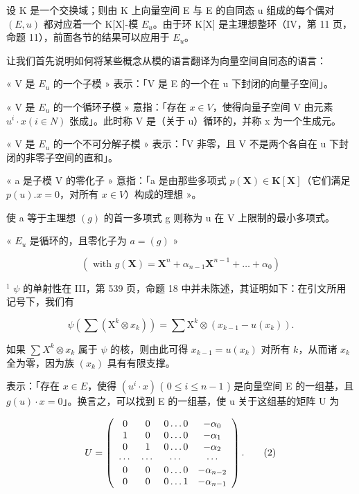 设 K 是一个交换域；则由 K 上向量空间 E 与 E 的自同态 u 组成的每个偶对 \((E, u)\) 都对应着一个 K{[}X{]}-模 \(E_{u}\)。由于环 K{[}X{]} 是主理想整环（IV，第 11 页，命题 11），前面各节的结果可以应用于 \(E_{u}\)。

让我们首先说明如何将某些概念从模的语言翻译为向量空间自同态的语言：

« V 是 \(E_{u}\) 的一个子模 » 表示：「V 是 E 的一个在 u 下封闭的向量子空间」。

« V 是 \(E_{u}\) 的一个循环子模 » 意指：「存在 \(x \in V\)，使得向量子空间 V 由元素 \(u^{i} \cdot x (i \in N)\) 张成」。此时称 V 是（关于 u）循环的，并称 x 为一个生成元。

« V 是 \(E_{u}\) 的一个不可分解子模 » 表示：「V 非零，且 V 不是两个各自在 u 下封闭的非零子空间的直和」。

« a 是子模 V 的零化子 » 意指：「a 是由那些多项式 \(p(\mathbf{X}) \in \mathbf{K}[\mathbf{X}]\)（它们满足 \(p(u).x = 0\)，对所有 \(x \in V\)）构成的理想 »。

使 a 等于主理想 \((g)\) 的首一多项式 g 则称为 u 在 V 上限制的最小多项式。

« \(E_{u}\) 是循环的，且零化子为 \(a = (g)\) »

\[
\left(\text { with } g (\mathbf {X}) = \mathbf {X} ^ {n} + \alpha_ {n - 1} \mathbf {X} ^ {n - 1} + \dots + \alpha_ {0}\right)
\]

\(^{1}\) \(\psi\) 的单射性在 III，第 539 页，命题 18 中并未陈述，其证明如下：在引文所用记号下，我们有

\[
\psi \left(\sum \left(\mathrm{X} ^ {k} \otimes x _ {k}\right)\right) = \sum \mathrm{X} ^ {k} \otimes \left(x _ {k - 1} - u (x _ {k})\right).
\]

如果 \(\sum X^k \otimes x_k\) 属于 \(\psi\) 的核，则由此可得 \(x_{k-1} = u(x_k)\) 对所有 \(k\)，从而诸 \(x_k\) 全为零，因为族 \((x_k)\) 具有有限支撑。

表示：「存在 \(x \in E\)，使得 \((u^{i} \cdot x)\) ( \(0 \leqslant i \leqslant n - 1\) ) 是向量空间 E 的一组基，且 \(g(u) \cdot x = 0\)」。换言之，可以找到 E 的一组基，使 u 关于这组基的矩阵 U 为

\[
U = \left( \begin{array}{c c c c} 0 & 0 & 0 \dots 0 & - \alpha_ {0} \\ 1 & 0 & 0 \dots 0 & - \alpha_ {1} \\ 0 & 1 & 0 \dots 0 & - \alpha_ {2} \\ \cdots & \cdots & \cdots & \cdots \\ 0 & 0 & 0 \dots 0 & - \alpha_ {n - 2} \\ 0 & 0 & 0 \dots 1 & - \alpha_ {n - 1} \end{array} \right).\tag{2}
\]

